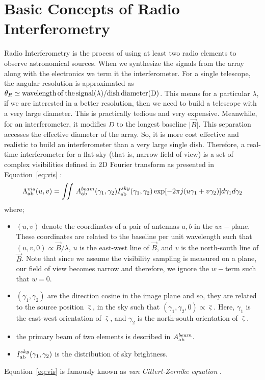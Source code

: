  
  \section{Basic Concepts of Radio Interferometry}	   \label{chap2:Interferometry}
  
  Radio Interferometry is the process of using at least two radio elements to observe astronomical sources. When we synthesize the signals
  from the array along with the electronics we term it the interferometer. For a single telescope, the angular resolution is approximated as 
  $\theta_R \simeq \rm wavelength \, of \, the \,signal (\lambda) / \rm  dish\, diameter (D)$. 
  This means for a particular $\lambda$, if we are interested in a better resolution, then we need to build a telescope with a very large diameter. This is practically tedious and very expensive. Meanwhile, for an interferometer, it modifies $D$ to 
  the longest baseline $\lvert \vec{B} \rvert$. This separation accesses the effective diameter of the array. So, it is more cost effective and realistic to build an interferometer than a very large single dish.
  Therefore, a real-time interferometer for a flat-sky (that is, narrow field of view) is a set of complex visibilities defined in 2D Fourier transform as presented in
  Equation~\ref{eq:vis} :
  \begin{equation} \label{eq:vis}
 \Lambda_{\rm ab}^{vis}(u, v) = \iint\, A_{\rm ab}^{beam}(\gamma_1,  \gamma_2)I_{\rm ab}^{sky}(\gamma_1,  \gamma_2)\exp[-2\pi j (u\gamma_1 + v\gamma_2)] d\gamma_1 d \gamma_2       %
\end{equation}
where;
\begin{itemize}
 \item $(u,v)$ denote the coordinates of a pair of antennas $a,b$ in the $uv-$plane. These coordinates are related to the baseline
 per unit wavelength such that $(u,v, 0) \propto \vec{B}/\lambda$, $u$ is the east-west line of $\vec{B}$, and $v$ is the north-south line of $\vec{B}$. Note that
 since we assume the visibility sampling is measured on a plane, our field of view becomes narrow and therefore, we ignore the $w-$term such that $w = 0$. 
 \item $(\gamma_1,  \gamma_2)$ are the direction cosine in the image plane and so, they are related to the source position $\hat{\mathbf{\varsigma}}$, in the sky such that 
 $(\gamma_1,  \gamma_2, 0) \propto \hat{\mathbf{\varsigma}}$. Here,  $\gamma_1$ is the east-west orientation of $\hat{\mathbf{\varsigma}}$, and $\gamma_2$ 
 is the north-south orientation of $\hat{\mathbf{\varsigma}}$.
 \item the primary beam of two elements is described in $ A_{\rm ab}^{beam}$. 
 \item $I_{\rm ab}^{sky}(\gamma_1,  \gamma_2)$ is the distribution of sky brightness.
\end{itemize}
Equation~\ref{eq:vis} is famously known as \textit{van Cittert-Zernike equation} \citep{Thompson2001,1974Thompson,2009Rau}.


